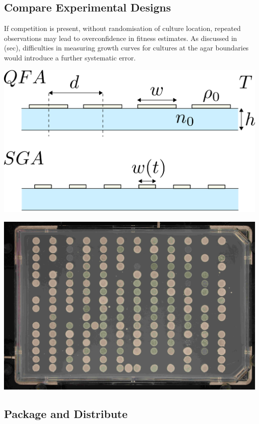 \subsection{Compare Experimental Designs}
\label{sec:comp-exper-designs}

If competition is present, without randomisation of culture location,
repeated observations may lead to overconfidence in fitness
estimates. As discussed in (sec), difficulties in measuring growth curves
for cultures at the agar boundaries would introduce a further
systematic error.

\begin{Figure}
  \centering
  \includegraphics[width=\linewidth]{qfa_v_sga_vars}
  \label{fig:exp_vars}
\end{Figure}






\begin{Figure}
  \centering
  \includegraphics[width=\linewidth]{K000343_027_001_2015-02-21_19-38-08}
  \label{fig:stripes}
\end{Figure}

\subsection{Package and Distribute}
\label{sec:package-distribute}


